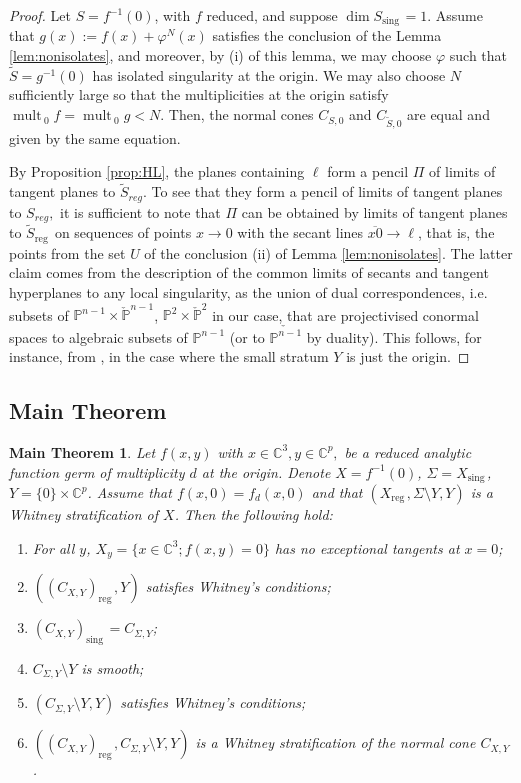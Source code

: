\documentclass[12pt]{amsart}
\newtheorem{mainthm}[theorem]{Main Theorem}
\theoremstyle{definition}
\numberwithin{equation}{section}
\newcommand{\C}{\mathbb{C}}
\DeclareMathOperator{\sing}{sing \, }
\DeclareMathOperator{\reg}{reg\,}
\DeclareMathOperator{\mult}{mult \,}
\begin{document}
\begin{proof}
Let $S=f^{-1} (0)$, with $f$ reduced, and suppose $\dim S_{\sing} =1$.  Assume that $g(x):=f(x) + \varphi^N(x)$ satisfies the conclusion of the Lemma \ref{lem:nonisolates}, and moreover, by (i) of this lemma, we may choose $\varphi$  such that  $\tilde S= g^{-1}(0)$ has isolated singularity at the origin.  We may also choose $N$ sufficiently large so that the multiplicities at the origin satisfy $\mult_0 f= \mult_0 g <N$.  Then, the normal cones $C_{S,0}$ and $C_{\tilde S, 0 }$ are equal and given by the same equation.  

By Proposition \ref{prop:HL}, the planes containing $\ell$ form a pencil $\Pi$ of limits of tangent planes to $\tilde S_{reg}$.  To see that they form a pencil of limits of tangent planes to $S_{reg},$ it is sufficient to note that $\Pi$ can be obtained by limits of tangent planes to $\tilde S_{\reg}$ on sequences of points $x\to 0$ with the secant lines $\overline {x0} \to \ell$, that is, the points from the set $U$ of the conclusion (ii) of Lemma  \ref{lem:nonisolates}.  The latter claim comes from the description of the common limits of secants and tangent hyperplanes to any local singularity, as the union of dual correspondences, i.e. subsets of  $\mathbb P^{n-1}\times \check{\mathbb P}^{n-1}$, $\mathbb P^{2}\times \check{\mathbb P}^{2}$ in our case,  that are projectivised conormal spaces to algebraic subsets of $\mathbb P^{n-1}$ (or to $\check{\mathbb P^{n-1}}$ by duality).  This follows, for instance, from \cite[Théorème 2.1.1]{LT88}, in the case where the small stratum $Y$ is just the origin.  
\end{proof}

\subsection{Main Theorem}

\begin{mainthm}\label{thm:main}
Let $f(x,y)$ with $x\in \C^3, y\in {\C}^p,$ be a reduced analytic function germ of multiplicity $d$ at the origin.  Denote $X=f^{-1}(0)$, $\Sigma = X_{\sing}$, $Y= \{0\}\times \C^p$.  
Assume that $f(x,0)= f_d(x,0)$ and that $(X_{\reg}, \Sigma\setminus Y,Y)$ is a Whitney stratification of $X$.  
Then the following hold:
\begin{enumerate}[label=\roman*)] 
\item  
For all $y$, $X_y= \{x\in \C^3; f(x,y)=0\}$ has no exceptional tangents at $x=0$;
\item 
$((C_{X,Y})_{\reg}, Y)$ satisfies Whitney's conditions;
\item  
$(C_{X,Y})_{\sing}=C_{\Sigma,Y}$;
\item
$C_{\Sigma,Y} \setminus Y$ is smooth;
\item 
$(C_{\Sigma,Y} \setminus Y, Y)$ satisfies Whitney's conditions;
\item $((C_{X,Y})_{\reg}, C_{\Sigma,Y}\setminus Y, Y)$
is a Whitney stratification of the normal cone  $C_{X,Y}$.
\end{enumerate}
\end{mainthm}
\end{document}
